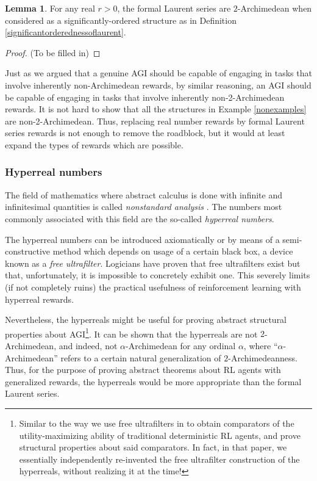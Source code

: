 \documentclass[reqno]{article}
\theoremstyle{definition}
\newtheorem{lemma}[theorem]{Lemma}
\begin{document}
\begin{lemma}
For any real $r>0$,
the formal Laurent series are $2$-Archimedean when considered as a
significantly-ordered structure as in Definition \ref{significantorderednessoflaurent}.
\end{lemma}

\begin{proof}
(To be filled in)
\end{proof}

Just as we argued that a genuine AGI should be capable of engaging in tasks that
involve inherently non-Archimedean rewards, by similar reasoning, an AGI should
be capable of engaging in tasks that involve inherently non-2-Archimedean rewards.
It is not hard to show that all the structures in Example \ref{nonexamples} are
non-2-Archimedean. Thus, replacing real number rewards by formal Laurent series
rewards is not enough to remove the roadblock, but it would at least expand the
types of rewards which are possible.


\subsubsection{Hyperreal numbers}

The field of mathematics where abstract calculus is done with infinite and infinitesimal
quantities is called \emph{nonstandard analysis} \cite{robinson}. The numbers most
commonly associated with this field are the so-called \emph{hyperreal numbers}.

The hyperreal numbers can be
introduced axiomatically or by means of a semi-constructive method which depends on
usage of a certain black box, a device known as a \emph{free ultrafilter}. Logicians
have proven that free ultrafilters exist but that, unfortunately, it is impossible to
concretely exhibit one. This severely limits (if not completely ruins) the practical
usefulness of reinforcement learning with hyperreal rewards.

Nevertheless, the hyperreals
might be useful for proving abstract structural properties about AGI\footnote{Similar to
the way we use free ultrafilters in \cite{alexander2019intelligence} to obtain
comparators of the utility-maximizing ability of traditional deterministic RL agents,
and prove structural properties about said comparators.
In fact, in that paper, we essentially independently re-invented the free ultrafilter
construction of the hyperreals, without realizing it at the time!}.
It can be shown that the hyperreals are not $2$-Archimedean, and indeed, not
$\alpha$-Archimedean for any ordinal $\alpha$, where ``$\alpha$-Archimedean'' refers to a
certain natural generalization of $2$-Archimedeanness. Thus, for the purpose of
proving abstract theorems about RL agents with generalized rewards, the hyperreals
would be more appropriate than the formal Laurent series.
\end{document}
